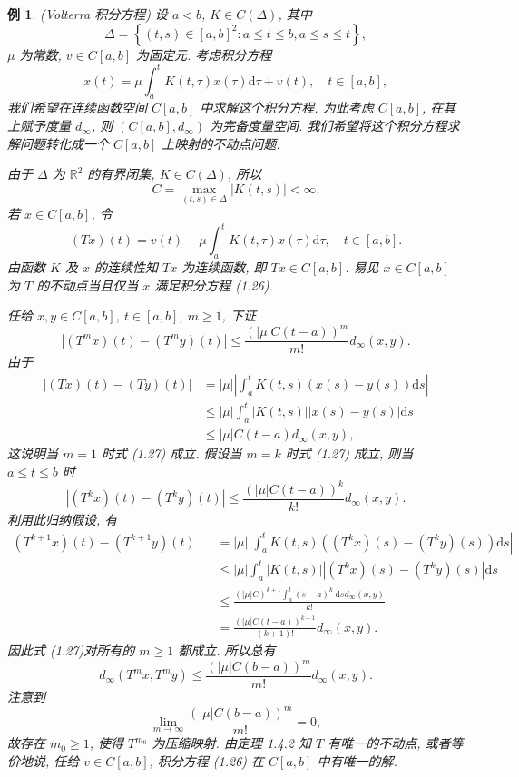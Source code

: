 \documentclass[openany]{ctexbook}
\theoremstyle{kaiti}
\theoremstyle{normal}
\newtheorem{example}{例}[section]
\begin{document}
\begin{example}
(Volterra 积分方程) 设 $a<b$, $K \in C(\Delta)$, 其中
$$
\Delta=\left\{(t, s) \in[a, b]^2: a \leqslant t \leqslant b, a \leqslant s \leqslant t\right\},
$$
$\mu$ 为常数, $v \in C[a, b]$ 为固定元. 考虑积分方程
\begin{equation}
  x(t)=\mu \int_{a}^{t} K(t, \tau) x(\tau) \mathrm{d} \tau+v(t), \quad t \in[a, b],
\end{equation}
我们希望在连续函数空间 $C[a, b]$ 中求解这个积分方程. 为此考虑 $C[a, b]$, 在其上赋予度量 $d_{\infty}$, 则 $\left(C[a, b], d_{\infty}\right)$ 为完备度量空间. 我们希望将这个积分方程求解问题转化成一个 $C[a,b]$ 上映射的不动点问题.

由于 $\Delta$ 为 $\mathbb{R}^2$ 的有界闭集, $K \in C(\Delta)$, 所以
$$
C=\max_{(t, s) \in \Delta}|K(t, s)|<\infty.
$$
若 $x \in C[a, b]$, 令
$$
(T x)(t)=v(t)+\mu \int_{a}^{t} K(t, \tau) x(\tau) \mathrm{d} \tau, \quad t \in[a, b].
$$
由函数 $K$ 及 $x$ 的连续性知 $T x$ 为连续函数, 即 $T x \in C[a, b]$. 易见 $x \in C[a, b]$ 为 $T$ 的不动点当且仅当 $x$ 满足积分方程 (1.26).

任给 $x, y \in C[a, b]$, $t \in[a, b]$, $m \geqslant 1$, 下证
\begin{equation}
  \left|\left(T^m x\right)(t)-\left(T^m y\right)(t)\right| \leqslant \frac{(|\mu| C(t-a))^m}{m !} d_{\infty}(x, y).
\end{equation}
由于
$$
\begin{aligned}
|(T x)(t)-(T y)(t)| &=|\mu|\left|\int_{a}^{t} K(t, s)(x(s)-y(s)) \mathrm{d} s\right| \\
& \leqslant|\mu| \int_{a}^{t}|K(t, s)||x(s)-y(s)| \mathrm{d} s \\
& \leqslant|\mu| C(t-a) d_{\infty}(x, y),
\end{aligned}
$$
这说明当 $m=1$ 时式 (1.27) 成立. 假设当 $m=k$ 时式 (1.27) 成立, 则当 $a \leqslant t \leqslant b$ 时
$$
\left|\left(T^{k} x\right)(t)-\left(T^{k} y\right)(t)\right| \leqslant \frac{(|\mu| C(t-a))^{k}}{k !} d_{\infty}(x, y).
$$
利用此归纳假设, 有
$$
\begin{aligned}
\left(T^{k+1} x\right)(t)-\left(T^{k+1} y\right)(t) \mid &=|\mu|\left|\int_{a}^{t} K(t, s)\left(\left(T^{k} x\right)(s)-\left(T^{k} y\right)(s)\right) \mathrm{d} s\right| \\
& \leqslant|\mu| \int_{a}^{t}|K(t, s)|\left|\left(T^{k} x\right)(s)-\left(T^{k} y\right)(s)\right| \mathrm{d} s \\
& \leqslant \frac{(|\mu| C)^{k+1} \int_{a}^{t}(s-a)^{k} \mathrm{~d} s d_{\infty}(x, y)}{k !} \\
&=\frac{(|\mu| C(t-a))^{k+1}}{(k+1) !} d_{\infty}(x, y).
\end{aligned}
$$
因此式 (1.27)对所有的 $m \geqslant 1$ 都成立. 所以总有
$$
d_{\infty}\left(T^m x, T^m y\right) \leqslant \frac{(|\mu| C(b-a))^m}{m !} d_{\infty}(x, y).
$$
注意到
$$
\lim_{m \rightarrow \infty} \frac{(|\mu| C(b-a))^m}{m !}=0,
$$
故存在 $m_0 \geqslant 1$, 使得 $T^{m_0}$ 为压缩映射. 由定理 1.4.2 知 $T$ 有唯一的不动点, 或者等价地说, 任给 $v \in C[a, b]$, 积分方程 (1.26) 在 $C[a, b]$ 中有唯一的解.
\end{example}
\end{document}
